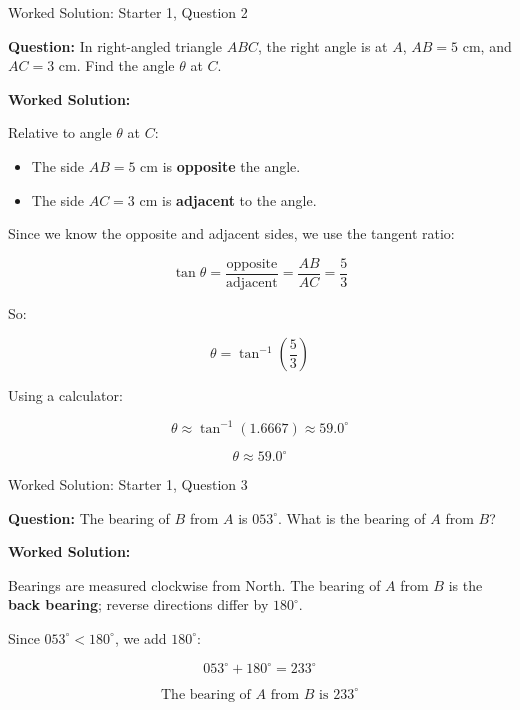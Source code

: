 \documentclass[aspectratio=169,11pt]{beamer}
\begin{document}
\begin{frame}{Worked Solution: Starter 1, Question 2}

\textbf{Question:} In right-angled triangle \(ABC\), the right angle is at \(A\), \(AB = 5\text{ cm}\), and \(AC = 3\text{ cm}\). Find the angle \(\theta\) at \(C\).

\textbf{Worked Solution:}

Relative to angle \(\theta\) at \(C\):
\begin{itemize}
\item The side \(AB = 5\text{ cm}\) is \textbf{opposite} the angle.
\item The side \(AC = 3\text{ cm}\) is \textbf{adjacent} to the angle.
\end{itemize}

Since we know the opposite and adjacent sides, we use the tangent ratio:

\[
\tan\theta = \frac{\text{opposite}}{\text{adjacent}} = \frac{AB}{AC} = \frac{5}{3}
\]

So:

\[
\theta = \tan^{-1}\left(\frac{5}{3}\right)
\]

Using a calculator:

\[
\theta \approx \tan^{-1}(1.6667) \approx 59.0^\circ
\]

\[
\boxed{\theta \approx 59.0^\circ}
\]

\end{frame}

\begin{frame}{Worked Solution: Starter 1, Question 3}

\textbf{Question:} The bearing of \(B\) from \(A\) is \(053^\circ\). What is the bearing of \(A\) from \(B\)?

\textbf{Worked Solution:}

Bearings are measured clockwise from North. The bearing of \(A\) from \(B\) is the \textbf{back bearing}; reverse directions differ by \(180^\circ\).

Since \(053^\circ < 180^\circ\), we add \(180^\circ\):

\[
053^\circ + 180^\circ = 233^\circ
\]

\[
\boxed{\text{The bearing of } A \text{ from } B \text{ is } 233^\circ}
\]

\end{frame}
\end{document}
